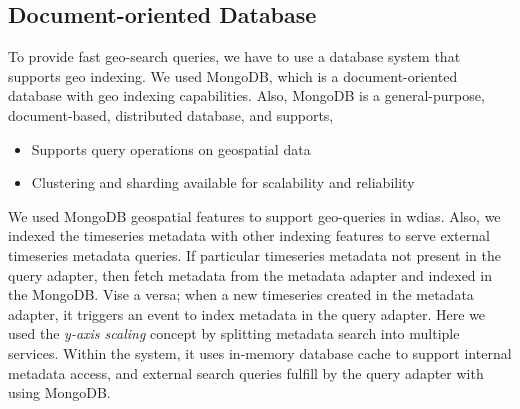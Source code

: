 \subsection{Document-oriented Database}
\label{subse:mongodb}

To provide fast geo-search queries, we have to use a database system that supports geo indexing. We used MongoDB, which is a document-oriented database with geo indexing capabilities. Also, MongoDB \cite{MongoDBMongoDBManual} is a general-purpose, document-based, distributed database, and supports,

\begin{itemize}
  \item Supports query operations on geospatial data \cite{MongoDBMongoDBManual}
  \item Clustering and sharding available for scalability and reliability
\end{itemize}

We used MongoDB geospatial features to support geo-queries in \acrshort{wdias}. Also, we indexed the timeseries metadata with other indexing features to serve external timeseries metadata queries. If particular timeseries metadata not present in the query adapter, then fetch metadata from the metadata adapter and indexed in the MongoDB. Vise a versa; when a new timeseries created in the metadata adapter, it triggers an event to index metadata in the query adapter.
Here we used the \emph{y-axis scaling} concept by splitting metadata search into multiple services. Within the system, it uses in-memory database cache to support internal metadata access, and external search queries fulfill by the query adapter with using MongoDB.
